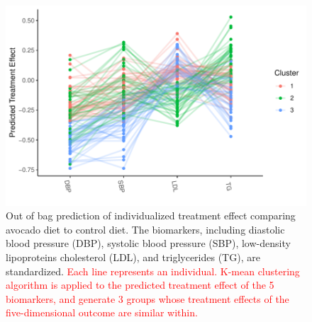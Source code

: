 \documentclass[smallextended]{svjour3}
\newcommand{\bg}[1]{\textcolor{red}{#1}}
\begin{document}


\begin{figure}[h]
    \centering
    \includegraphics[width = \textwidth]{Fig4_AvocadoTreatmentEffect_V3.pdf}
    \caption{ Out of bag prediction of individualized treatment effect comparing avocado diet to control diet. The biomarkers, including diastolic blood pressure (DBP), systolic blood pressure (SBP), low-density lipoproteins cholesterol (LDL), and triglycerides (TG), are standardized. \bg{Each line represents an individual. K-mean clustering algorithm is applied to the predicted treatment effect of the 5 biomarkers, and generate 3 groups whose treatment effects of the five-dimensional outcome are similar within.}}\label{AvocadoPlot}
\end{figure}
\end{document}
